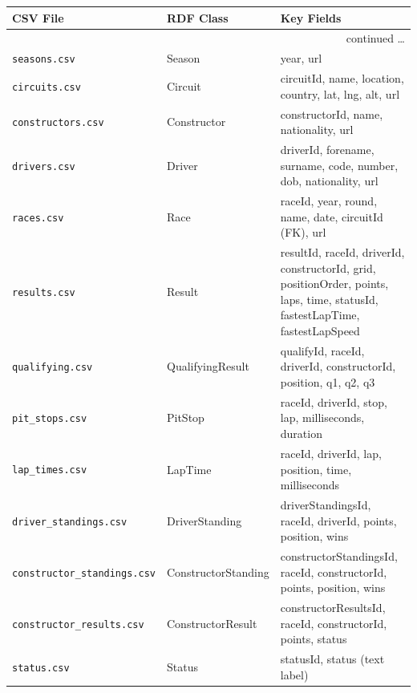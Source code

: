 \documentclass[12pt,a4paper]{article}
\begin{document}
\begin{center}
\begin{longtable}{@{}llp{6.5cm}@{}}
\toprule
\textbf{CSV File}              & \textbf{RDF Class}       & \textbf{Key Fields} \\
\midrule
\endhead
\midrule
\multicolumn{3}{r}{\small continued \ldots}\\
\endfoot
\bottomrule
\endlastfoot
\texttt{seasons.csv}           & Season                   & year, url \\
\texttt{circuits.csv}          & Circuit                  & circuitId, name, location, country, lat, lng, alt, url \\
\texttt{constructors.csv}      & Constructor              & constructorId, name, nationality, url \\
\texttt{drivers.csv}           & Driver                   & driverId, forename, surname, code, number, dob, nationality, url \\
\texttt{races.csv}             & Race                     & raceId, year, round, name, date, circuitId (FK), url \\
\texttt{results.csv}           & Result                   & resultId, raceId, driverId, constructorId, grid, positionOrder, points, laps, time, statusId, fastestLapTime, fastestLapSpeed \\
\texttt{qualifying.csv}        & QualifyingResult         & qualifyId, raceId, driverId, constructorId, position, q1, q2, q3 \\
\texttt{pit\_stops.csv}         & PitStop                  & raceId, driverId, stop, lap, milliseconds, duration \\
\texttt{lap\_times.csv}         & LapTime                  & raceId, driverId, lap, position, time, milliseconds \\
\texttt{driver\_standings.csv}  & DriverStanding           & driverStandingsId, raceId, driverId, points, position, wins \\
\texttt{constructor\_standings.csv} & ConstructorStanding & constructorStandingsId, raceId, constructorId, points, position, wins \\
\texttt{constructor\_results.csv}   & ConstructorResult   & constructorResultsId, raceId, constructorId, points, status \\
\texttt{status.csv}            & Status                   & statusId, status (text label) \\
\end{longtable}
\end{center}
\end{document}
